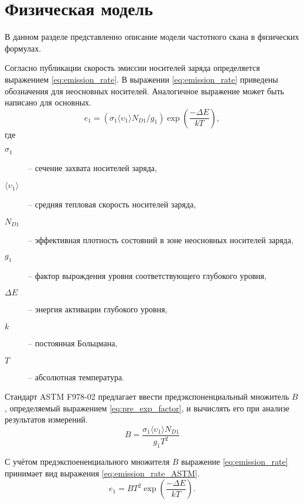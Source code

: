 \chapter{Физическая модель}

    В данном разделе представленно описание модели частотного скана 
    в физических формулах.

    Согласно публикации \cite{LangDLTS} скорость эмиссии носителей
    заряда определяется выражением \ref{eq:emission_rate}. В
    выражении \ref{eq:emission_rate} приведены обозначения для
    неосновных носителей. Аналогичное выражение может быть написано 
    для основных.
    \begin{equation}
        \label{eq:emission_rate}
        e_1 = \left(\sigma_1 \langle\upsilon_1\rangle N_{D1}/g_1\right)\exp
        \left(\frac{-\Delta E}{kT}\right),
    \end{equation}
    где
    \begin{description}
        \item[$\sigma_1$] -- сечение захвата носителей заряда,
        \item[$\langle\upsilon_1\rangle$] -- средняя тепловая скорость
        носителей заряда,
        \item[$N_{D1}$] -- эффективная плотность состояний в зоне неосновных
        носителей заряда,
        \item[$g_1$] -- фактор вырождения уровня соответствующего глубокого
        уровня,
        \item[$\Delta E$]  -- энергия активации глубокого уровня,
        \item[$k$] -- постоянная Больцмана,
        \item[$T$] -- абсолютная температура.
    \end{description}

    Стандарт ASTM F978-02 предлагает ввести предэкспоненциальный множитель
    $B$, определяемый выражением \ref{eq:pre_exp_factor}, и вычислять его
    при анализе результатов измерений.
    \begin{equation}
        \label{eq:pre_exp_factor}
        B = \frac{\sigma_1 \langle\upsilon_1\rangle N_{D1}}{g_1 T^2}
    \end{equation}

    С учётом предэкспоененциального множителя $B$ выражение 
    \ref{eq:emission_rate} принимает вид выражения \ref{eq:emission_rate_ASTM}.
    \begin{equation}
        \label{eq:emission_rate_ASTM}
        e_1 = BT^2\exp\left(\frac{-\Delta E}{kT}\right).
    \end{equation}
    
